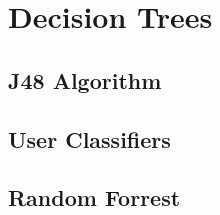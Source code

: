 \section{Decision Trees}


\subsection{J48 Algorithm}


\subsection{User Classifiers}



\subsection{Random Forrest}